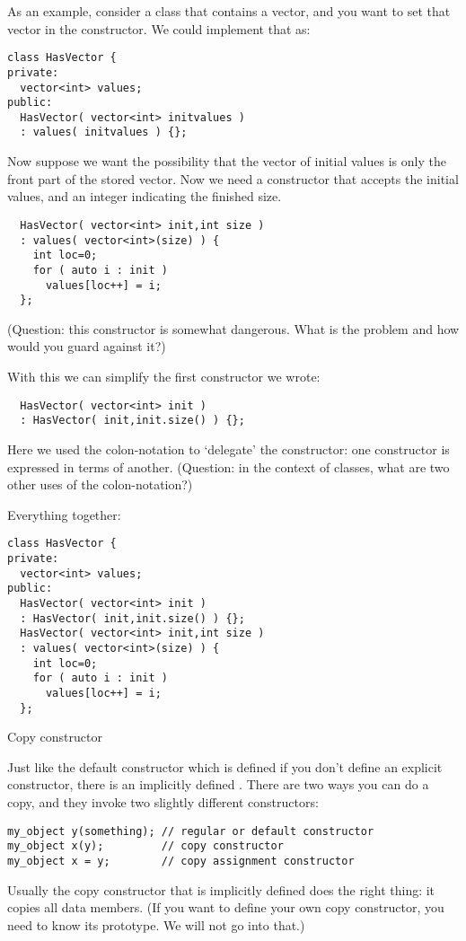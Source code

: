 As an example, consider a class that contains a vector,
and you want to set that vector in the constructor.
We could implement that as:
\begin{lstlisting}
class HasVector {
private:
  vector<int> values;
public:
  HasVector( vector<int> initvalues )
  : values( initvalues ) {};
\end{lstlisting}
Now suppose we want the possibility that
the vector of initial values
is only the front part of the stored vector.
Now we need a constructor that accepts
the initial values, and an integer indicating
the finished size.
\begin{lstlisting}
  HasVector( vector<int> init,int size )
  : values( vector<int>(size) ) {
    int loc=0;
    for ( auto i : init )
      values[loc++] = i;
  };
\end{lstlisting}
(Question: this constructor is somewhat dangerous.
What is the problem and how would you guard against it?)

With this we can simplify the first constructor we wrote:
\begin{lstlisting}
  HasVector( vector<int> init )
  : HasVector( init,init.size() ) {};
\end{lstlisting}
Here we used the colon-notation to `delegate' the constructor:
one constructor is expressed in terms of another.
(Question: in the context of classes, what are
two other uses of the colon-notation?)

Everything together:
\begin{lstlisting}
class HasVector {
private:
  vector<int> values;
public:
  HasVector( vector<int> init )
  : HasVector( init,init.size() ) {};
  HasVector( vector<int> init,int size )
  : values( vector<int>(size) ) {
    int loc=0;
    for ( auto i : init )
      values[loc++] = i;
  };
\end{lstlisting}

 {Copy constructor}
\label{sec:copy-constructor}

Just like the default constructor which is defined if you don't define
an explicit constructor, there is an implicitly defined
.
%
There are two ways you can do a copy, and they
invoke two slightly different constructors:
\begin{lstlisting}
my_object y(something); // regular or default constructor
my_object x(y);         // copy constructor
my_object x = y;        // copy assignment constructor
\end{lstlisting}
Usually the copy constructor that is implicitly defined does the right
thing: it copies all data members. (If you want to define your own copy
constructor, you need to know its prototype. We will not go into that.)

